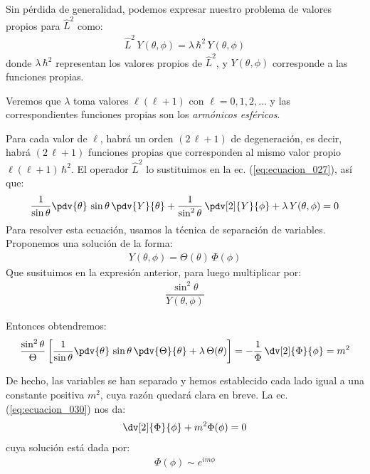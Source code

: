 Sin pérdida de generalidad, podemos expresar nuestro problema de valores propios para $\hat{L}^{2}$ como:
\begin{align}
\hat{L}^{2} \, Y(\theta, \phi) = \lambda \, \hbar^{2} \, Y(\theta, \phi)
\label{eq:ecuacion_027}
\end{align}
donde $\lambda \, \hbar^{2}$ representan los valores propios de $\hat{L}^{2}$, y $Y(\theta, \phi)$ corresponde a las funciones propias. 
\par
Veremos que $\lambda$ toma valores $\ell (\ell + 1)$ con $\ell = 0, 1, 2, \ldots$ y las correspondientes funciones propias son los \emph{armónicos esféricos}.
\par
Para cada valor de $\ell$, habrá un orden $(2 \, \ell + 1)$ de degeneración, es decir, habrá $(2 \, \ell + 1)$ funciones propias que corresponden al mismo valor propio $\ell (\ell + 1) \, \hbar^{2}$. El operador $\hat{L}^{2}$ lo sustituimos en la ec. (\ref{eq:ecuacion_027}), así que:
\begin{align}
\dfrac{1}{\sin \theta} \pdv{\theta} \, \sin \theta \, \pdv{Y}{\theta} + \dfrac{1}{\sin^{2} \theta} \, \pdv[2]{Y}{\phi} + \lambda \, Y(\theta, \phi) = 0
\end{align}
Para resolver esta ecuación, usamos la técnica de separación de variables. Proponemos una solución de la forma:
\begin{align}
Y(\theta, \phi) = \Theta(\theta) \, \Phi(\phi)
\label{eq:ecuacion_029}
\end{align}
Que susituimos en la expresión anterior, para luego multiplicar por:
\begin{align*}
\dfrac{\sin^{2} \theta}{Y(\theta, \phi)}
\end{align*}

Entonces obtendremos:
\begin{align}
\dfrac{\sin^{2} \theta}{\Theta} \left[ \dfrac{1}{\sin \theta} \pdv{\theta} \, \sin \theta \, \pdv{\Theta}{\theta} + \lambda \, \Theta (\theta) \right] = -  \dfrac{1}{\Phi} \, \dv[2]{\Phi}{\phi} = m^{2}
\label{eq:ecuacion_030}
\end{align}

De hecho, las variables se han separado y hemos establecido cada lado igual a una constante positiva $m^{2}$, cuya razón quedará clara en breve. La ec. (\ref{eq:ecuacion_030}) nos da:
\begin{align*}
\dv[2]{\Phi}{\phi} + m^{2} \Phi (\phi) = 0
\end{align*}
cuya solución está dada por:
\begin{align*}
\Phi(\phi) \sim e^{i m \phi}
\end{align*}


